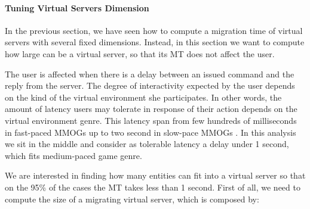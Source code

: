 \documentclass[final,10pt,a5paper]{phdimt}
\theoremstyle{definition}
\begin{document}
\paragraph{Tuning Virtual Servers Dimension}

In the previous section, we have seen how to compute a migration time of virtual servers with several fixed dimensions.
Instead, in this section we want to compute how large can be a virtual server, so that its MT does not affect the user.

The user is affected when there is a delay between an issued command and the reply from the server. The degree of interactivity expected by the user depends on the kind of the virtual environment she participates. In other words, the amount of latency users may tolerate in response of their action depends on the virtual environment genre.
This latency span from few hundreds of milliseconds in fast-paced MMOGs up to two second in slow-pace MMOGs \cite{claypool2006latency}.
In this analysis we sit in the middle and consider as tolerable latency a delay under 1 second, which fits medium-paced game genre.

We are interested in finding how many entities can fit into a virtual server so that on the 95\% of the cases the MT takes less than 1 second. First of all, we need to compute the size of a migrating virtual server, which is composed by:
\end{document}
